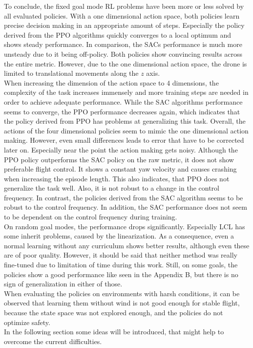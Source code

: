 To conclude, the fixed goal mode RL problems have been more or less solved
by all evaluated policies.
With a one dimensional action space, both policies learn precise decision making 
in an appropriate amount of steps. Especially the policy derived from the PPO algorithms
quickly converges to a local optimum and shows steady performance.
In comparison, the SACs performance is much more unsteady due to it being off-policy.
Both policies show convincing results across the entire metric.
However, due to the one dimensional action space, the drone is limited to 
translational movements along the $z$ axis.\\
When increasing the dimension of the action space to 4 dimensions, the 
complexity of the task increases immensely and more training steps
are needed in order to achieve adequate performance.
While the SAC algorithms performance seems to converge, the PPO performance
decreases again, which indicates that the policy derived from PPO has problems 
at generalizing this task.
Overall, the actions of the four dimensional policies seem to mimic
the one dimensional action making. However, even small differences leads
to error that have to be corrected later on. 
Especially near the point the action making gets noisy.
Although the PPO policy outperforms the SAC policy on the raw metric,
it does not show preferable flight control.
It shows a constant yaw velocity and causes crashing when increasing the episode length.
This also indicates, that PPO does not generalize the task well.
Also, it is not robust to a change in the control frequency.
In contrast, the policies derived from the SAC algorithm seems to be robust
to the control frequency. In addition, the SAC performance does not seem to be 
dependent on the control frequency during training.\\
On random goal modes, the performance drops significantly.
Especially LCL has some inherit problems, caused by the linearization. As a consequence,
even a normal learning without any curriculum shows better results, although
even these are of poor quality.
However, it should be said that neither method was really fine-tuned due to limitation
of time during this work. Still, on some goals, 
the policies show a good performance like seen in the Appendix B, but there is no sign of 
generalization in either of those.\\
When evaluating the policies on environments with harsh conditions, it can be observed that 
learning them without wind is not good enough for stable flight, because the state space was not explored enough, and the policies do not optimize safety.\\
In the following section some ideas will be introduced, that might help to
overcome the current difficulties.

